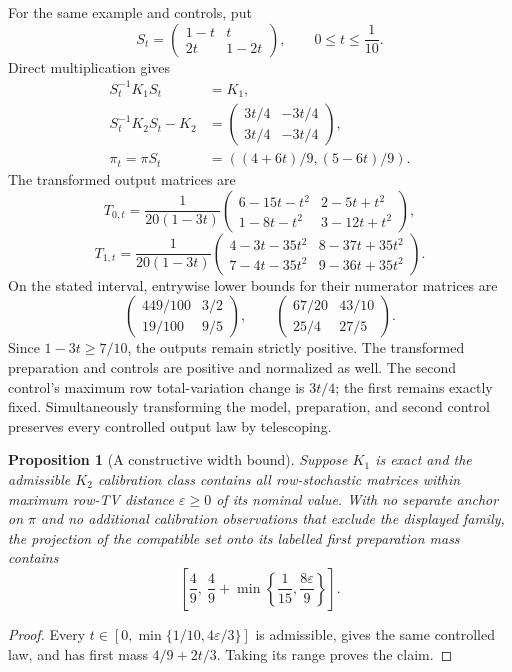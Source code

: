 \documentclass[11pt,letterpaper]{article}
\newtheorem{proposition}[theorem]{Proposition}
\begin{document}
For the same example and controls, put
\[
 S_t=\begin{pmatrix}1-t&t\\2t&1-2t\end{pmatrix},\qquad 0\le t\le\frac1{10}.
\]
Direct multiplication gives
\begin{align*}
 S_t^{-1}K_1S_t&=K_1,\\
 S_t^{-1}K_2S_t-K_2&=
 \begin{pmatrix}3t/4&-3t/4\\3t/4&-3t/4\end{pmatrix},\\
 \pi_t=\pi S_t&=((4+6t)/9,(5-6t)/9).
\end{align*}
The transformed output matrices are
\[
 T_{0,t}=\frac1{20(1-3t)}
 \begin{pmatrix}
 6-15t-t^2&2-5t+t^2\\
 1-8t-t^2&3-12t+t^2
 \end{pmatrix},
\]
\[
 T_{1,t}=\frac1{20(1-3t)}
 \begin{pmatrix}
 4-3t-35t^2&8-37t+35t^2\\
 7-4t-35t^2&9-36t+35t^2
 \end{pmatrix}.
\]
On the stated interval, entrywise lower bounds for their numerator matrices are
\[
 \begin{pmatrix}449/100&3/2\\19/100&9/5\end{pmatrix},\qquad
 \begin{pmatrix}67/20&43/10\\25/4&27/5\end{pmatrix}.
\]
Since \(1-3t\ge7/10\), the outputs remain strictly positive. The transformed
preparation and controls are positive and normalized as well. The second control's maximum row total-variation change is $3t/4$; the first remains exactly fixed. Simultaneously transforming the model, preparation, and second control preserves every controlled output law by telescoping.

\begin{proposition}[A constructive width bound]
Suppose $K_1$ is exact and the admissible $K_2$ calibration class contains all row-stochastic matrices within maximum row-TV distance $\varepsilon\ge0$ of its nominal value. With no separate anchor on $\pi$ and no additional calibration observations that exclude the displayed family, the projection of the compatible set onto its labelled first preparation mass contains
\begin{equation}
 \left[\frac49,\ \frac49+\min\left\{\frac1{15},\frac{8\varepsilon}{9}\right\}\right].
 \label{eq:width}
\end{equation}
\end{proposition}
\begin{proof}
Every $t\in[0,\min\{1/10,4\varepsilon/3\}]$ is admissible, gives the same controlled law, and has first mass $4/9+2t/3$. Taking its range proves the claim.
\end{proof}
\end{document}

